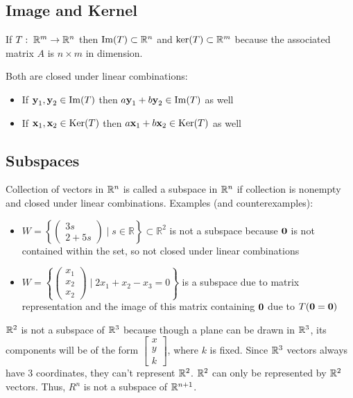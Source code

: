 \subsection{Image and Kernel}

If $T:\;\mathbb{R}^m\rightarrow \mathbb{R}^n$ then $\mathrm{Im}(T)\subset \mathbb{R}^n$ and
$\mathrm{ker}(T)\subset \mathbb{R}^m$ because the associated matrix $A$ is $n\times m$ in dimension.\newline

\noindent
Both are closed under linear combinations:
\begin{itemize}
    \item If $\textbf y_1 ,\textbf y_2 \in \mathrm{Im}(T)$ then $a \textbf{y}_{1}+b \textbf{y}_{2} \in \mathrm{Im}(T)$ as well
    \item If $\textbf x_1 ,\textbf x_2 \in \mathrm{Ker}(T)$ then $a\textbf x_1 +b\textbf x_2 \in \mathrm{Ker}(T)$ as well
\end{itemize}

\subsection{Subspaces}

Collection of vectors in $\mathbb{R}^n$ is called a subspace in $\mathbb{R}^n$ if collection is nonempty and closed under linear combinations.
Examples (and counterexamples):

\begin{itemize}
    \item $W=\left\{\left(\begin{array}{c}
        3 s \\
        2+5 s
        \end{array}\right) \mid s \in \mathbb{R}\right\} \subset \mathbb{R}^{2}$
        is not a subspace because $\textbf{0}$ is not contained within the set, so not closed under linear combinations
    \item $W=\left\{\left(\begin{array}{l}
        x_{1} \\
        x_{2} \\
        x_{2}
        \end{array}\right) \mid 2 x_{1}+x_{2}-x_{3}=0\right\}$ is a subspace due to matrix representation and 
        the image of this matrix containing $\textbf{0}$ due to $T(\textbf{0}=\textbf{0})$
\end{itemize}

\noindent
$\mathbb{R}^2$ is not a subspace of $\mathbb{R}^3$ because though a plane can be drawn in $\mathbb{R}^3$, its components will be of the form
$\begin{bmatrix}x\\ y\\k\end{bmatrix}$, where $k$ is fixed. Since $\mathbb{R}^3$ vectors always have 3 coordinates, they can't represent $\mathbb{R}^2$.
$\mathbb{R}^2$ can only be represented by $\mathbb{R}^2$ vectors. Thus, $R^n$ is not a subspace of $\mathbb{R}^{n+1}$.\\

